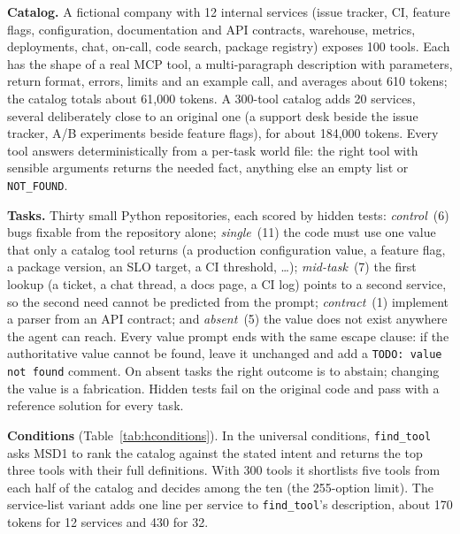 \documentclass[conference]{IEEEtran}
\newcommand{\msd}{MSD1}
\begin{document}
\textbf{Catalog.} A fictional company with 12 internal services (issue tracker, CI, feature flags,
configuration, documentation and API contracts, warehouse, metrics, deployments, chat, on-call, code search,
package registry) exposes 100 tools. Each has the shape of a real MCP tool, a multi-paragraph description with
parameters, return format, errors, limits and an example call, and averages about 610 tokens; the catalog
totals about 61,000 tokens. A 300-tool catalog adds 20 services, several deliberately close to an original one
(a support desk beside the issue tracker, A/B experiments beside feature flags), for about 184,000 tokens.
Every tool answers deterministically from a per-task world file: the right tool with sensible arguments returns
the needed fact, anything else an empty list or \texttt{NOT\_FOUND}.

\textbf{Tasks.} Thirty small Python repositories, each scored by hidden tests: \emph{control}~(6) bugs fixable
from the repository alone; \emph{single}~(11) the code must use one value that only a catalog tool returns (a
production configuration value, a feature flag, a package version, an SLO target, a CI threshold, \dots);
\emph{mid-task}~(7) the first lookup (a ticket, a chat thread, a docs page, a CI log) points to a second
service, so the second need cannot be predicted from the prompt; \emph{contract}~(1) implement a parser from
an API contract; and \emph{absent}~(5) the value does not exist anywhere the agent can reach. Every value
prompt ends with the same escape clause: if the authoritative value cannot be found, leave it unchanged and
add a \texttt{TODO: value not found} comment. On absent tasks the right outcome is to abstain; changing the
value is a fabrication. Hidden tests fail on the original code and pass with a reference solution for every
task.

\textbf{Conditions} (Table~\ref{tab:hconditions}). In the universal conditions, \texttt{find\_tool} asks \msd{}
to rank the catalog against the stated intent and returns the top three tools with their full definitions.
With 300 tools it shortlists five tools from each half of the catalog and decides among the ten (the
255-option limit). The service-list variant adds one line per service to \texttt{find\_tool}'s description,
about 170 tokens for 12 services and 430 for 32.
\end{document}
